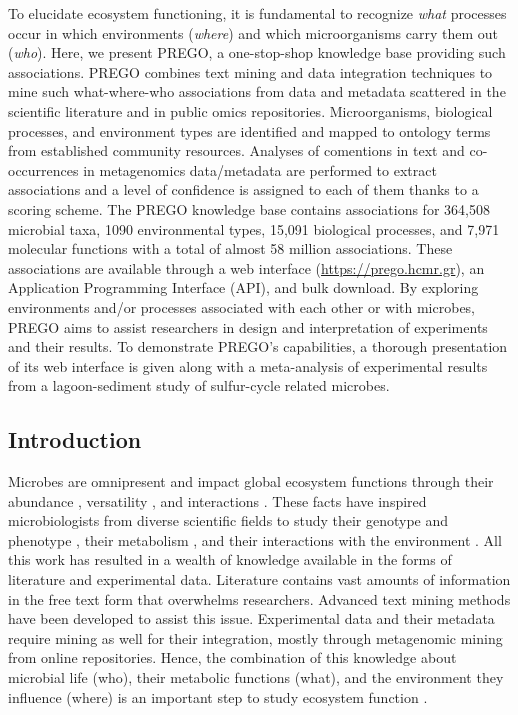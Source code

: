    To elucidate ecosystem functioning, it is fundamental to recognize \textit{what} processes occur in which environments (\textit{where}) and which microorganisms carry them out (\textit{who}). 
   Here, we present PREGO, a one-stop-shop knowledge base providing such associations. 
   PREGO combines text mining and data integration techniques to mine such what-where-who associations from data and metadata scattered in the scientific literature and in public omics repositories. 
   Microorganisms, biological processes, and environment types are identified and mapped to ontology terms from established community resources. 
   Analyses of comentions in text and co-occurrences in metagenomics data/metadata are performed to extract associations and a level of confidence is assigned to each of them thanks to a scoring scheme. 
   The PREGO knowledge base contains associations for 364,508 microbial taxa, 1090 environmental types, 15,091 biological processes, and 7,971 molecular functions with a total of almost 58 million associations. 
   These associations are available through a web interface (\href{https://prego.hcmr.gr}{https://prego.hcmr.gr}), an Application Programming Interface (API), and bulk download. 
   By exploring environments and/or processes associated with each other or with microbes, PREGO aims to assist researchers in design and interpretation of experiments and their results. 
   To demonstrate PREGO's capabilities, a thorough presentation of its web interface is given along with a meta-analysis of experimental results from a lagoon-sediment study of sulfur-cycle related microbes.

\subsection{Introduction}
\label{sec:prego-intro}

   Microbes are omnipresent and impact global ecosystem functions \citep{falkowski2008microbial} through their abundance \citep{bar2018biomass}, versatility \citep{delgado2016microbial}, and interactions \citep{rottjers2018hairballs}. 
   These facts have inspired microbiologists from diverse scientific fields to study their genotype and phenotype \citep{morris2020linking}, their metabolism \citep{biggs2015metabolic}, and their interactions with the environment \citep{hall2018understanding}. 
   All this work has resulted in a wealth of knowledge available in the forms of literature and experimental data. Literature contains vast amounts of information in the free text form that overwhelms researchers. 
   Advanced text mining methods \citep{jensen2006literature} have been developed to assist this issue. 
   Experimental data and their metadata require mining \citep{delmont2011metagenomic} as well for their integration, mostly through metagenomic mining from online repositories. 
   Hence, the combination of this knowledge about microbial life (who), their metabolic functions (what), and the environment they influence (where) is an important step to study ecosystem function \citep{raes2008molecular}.

